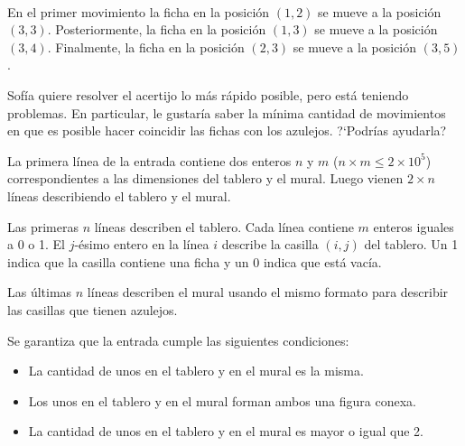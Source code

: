 \documentclass{oci}
\def\nrows{3}
\def\ncols{5}
\newcommand{\drawnumbers}{
  \foreach \col in {1, ..., \ncols} {
    \node at (\col - 0.5, 3.35) {\col};
  }
  \foreach \row in {1, ..., \nrows} {
    \node at (-0.35, \nrows - \row + 0.5) {\row};
  }
}
\begin{document}
\begin{problemDescription}
\begin{center}
  ~
\end{center}
En el primer movimiento la ficha en la posición $(1, 2)$ se mueve a la
posición $(3, 3)$.
%
Posteriormente, la ficha en la posición $(1, 3)$ se mueve a la posición
$(3, 4)$.
%
Finalmente, la ficha en la posición $(2, 3)$ se mueve a la posición  $(3, 5)$.

Sofía quiere resolver el acertijo lo más rápido posible, pero está
teniendo problemas.
En particular, le gustaría saber la mínima cantidad de movimientos
en que es posible hacer coincidir las fichas con los azulejos.
?`Podrías ayudarla?

\end{problemDescription}

\begin{inputDescription}
  La primera línea de la entrada contiene dos enteros $n$ y $m$ ($n \times m \leq 2 \times 10^5$)
  correspondientes a las dimensiones del tablero y el mural.
  Luego vienen $2 \times n$ líneas describiendo el tablero y el mural.

  Las primeras $n$ líneas describen el tablero.
  Cada línea contiene $m$ enteros iguales a 0 o 1.
  El $j$-ésimo entero en la línea $i$ describe la casilla $(i, j)$ del tablero.
  Un 1 indica que la casilla contiene una ficha y un 0 indica que está vacía.

  Las últimas $n$ líneas describen el mural usando el mismo formato para describir
  las casillas que tienen azulejos.

  Se garantiza que la entrada cumple las siguientes condiciones:
  \begin{itemize}
    \item La cantidad de unos en el tablero y en el mural es la misma.
    \item Los unos en el tablero y en el mural forman ambos una figura conexa.
    \item La cantidad de unos en el tablero y en el mural es mayor o igual que 2.
  \end{itemize}
\end{inputDescription}
\end{document}
